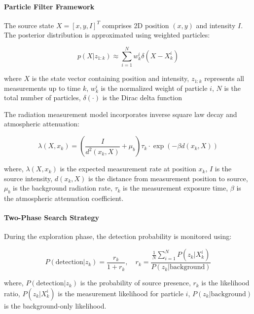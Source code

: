 \documentclass[../report.tex]{subfiles}
\begin{document}
    \paragraph{Particle Filter Framework}
    The source state $X = [x, y, I]^T$ comprises 2D position $(x,y)$ and intensity $I$. The posterior distribution is approximated using weighted particles:

    \begin{equation}
    p(X|z_{1:k}) \approx \sum_{i=1}^N w_k^i \delta(X - X_k^i)
    \end{equation}

    where $X$ is the state vector containing position and intensity, $z_{1:k}$ represents all measurements up to time $k$, $w_k^i$ is the normalized weight of particle $i$, $N$ is the total number 
    of particles, $\delta(\cdot)$ is the Dirac delta function

    The radiation measurement model incorporates inverse square law decay and atmospheric attenuation:

    \begin{equation}
    \lambda(X, x_k) = \left(\frac{I}{d^2(x_k, X)} + \mu_b\right)\tau_k \cdot \exp(-\beta d(x_k, X))
    \end{equation}

    where, $\lambda(X, x_k)$ is the expected measurement rate at position $x_k$, $I$ is the source intensity, $d(x_k, X)$ is the distance from measurement position to source, $\mu_b$ is the 
    background radiation rate, $\tau_k$ is the measurement exposure time, $\beta$ is the atmospheric attenuation coefficient.

    \paragraph{Two-Phase Search Strategy}
    During the exploration phase, the detection probability is monitored using:

    \begin{equation}
    P(\text{detection}|z_k) = \frac{r_k}{1 + r_k}, \quad r_k = \frac{\frac{1}{N}\sum_{i=1}^N P(z_k|X_k^i)}{P(z_k|\text{background})}
    \label{eq:prob_detection}
    \end{equation}

    where, $P(\text{detection}|z_k)$ is the probability of source presence, $r_k$ is the likelihood ratio, $P(z_k|X_k^i)$ is the measurement likelihood for particle $i$, $P(z_k|\text{background})$ 
    is the background-only likelihood.
\end{document}
